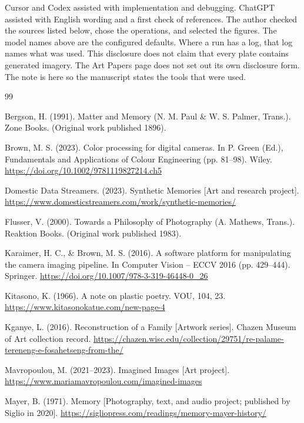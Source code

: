 \documentclass[manuscript,review,anonymous,authoryear]{acmart}
\begin{document}
Cursor and Codex assisted with implementation and debugging. ChatGPT assisted with English wording and a first check of references. The author checked the sources listed below, chose the operations, and selected the figures. The model names above are the configured defaults. Where a run has a log, that log names what was used. This disclosure does not claim that every plate contains generated imagery. The Art Papers page does not set out its own disclosure form. The note is here so the manuscript states the tools that were used.


\begin{thebibliography}{99}

 Bergson, H. (1991). Matter and Memory (N. M. Paul \& W. S. Palmer, Trans.). Zone Books. (Original work published 1896).

 Brown, M. S. (2023). Color processing for digital cameras. In P. Green (Ed.), Fundamentals and Applications of Colour Engineering (pp. 81--98). Wiley. \url{https://doi.org/10.1002/9781119827214.ch5}

 Domestic Data Streamers. (2023). Synthetic Memories [Art and research project]. \url{https://www.domesticstreamers.com/work/synthetic-memories/}

 Flusser, V. (2000). Towards a Philosophy of Photography (A. Mathews, Trans.). Reaktion Books. (Original work published 1983).

 Karaimer, H. C., \& Brown, M. S. (2016). A software platform for manipulating the camera imaging pipeline. In Computer Vision -- ECCV 2016 (pp. 429--444). Springer. \url{https://doi.org/10.1007/978-3-319-46448-0_26}

 Kitasono, K. (1966). A note on plastic poetry. VOU, 104, 23. \url{https://www.kitasonokatue.com/new-page-4}

 Kganye, L. (2016). Reconstruction of a Family [Artwork series]. Chazen Museum of Art collection record. \url{https://chazen.wisc.edu/collection/29751/re-palame-tereneng-e-fosahetseng-from-the/}

 Mavropoulou, M. (2021--2023). Imagined Images [Art project]. \url{https://www.mariamavropoulou.com/imagined-images}

 Mayer, B. (1971). Memory [Photography, text, and audio project; published by Siglio in 2020]. \url{https://sigliopress.com/readings/memory-mayer-history/}


\end{thebibliography}
\end{document}
